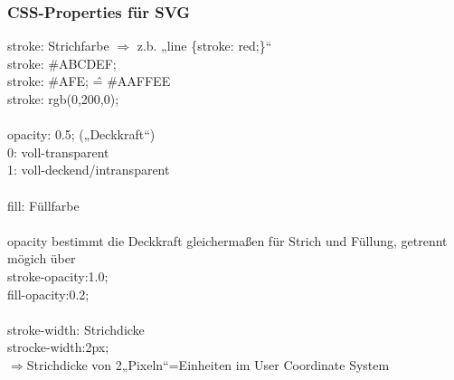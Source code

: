\subsubsection{CSS-Properties für SVG}
stroke: Strichfarbe $\Rightarrow$ z.b. „line \{stroke: red;\}“\\
stroke: \#ABCDEF;\\
stroke: \#AFE; \^= \#AAFFEE\\
stroke: rgb(0,200,0);\\
\\
opacity: 0.5; („Deckkraft“)\\
0: voll-transparent\\
1: voll-deckend/intransparent\\
\\
fill: Füllfarbe\\
\\
opacity bestimmt die Deckkraft gleichermaßen für Strich und Füllung, getrennt mögich über\\
stroke-opacity:1.0;\\
fill-opacity:0.2;\\
\\
stroke-width: Strichdicke\\
strocke-width:2px;\\
$\Rightarrow$Strichdicke von 2„Pixeln“=Einheiten im User Coordinate System
